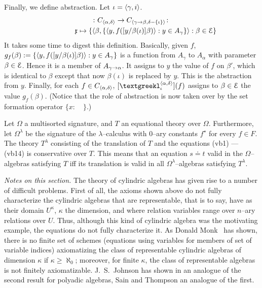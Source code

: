 Finally, we define abstraction. Let $\iota = \langle \gamma, i\rangle$.
\begin{multline}
[\tlambda^{\auf \alpha, \delta\zu}_{\iota}] \colon 
	C_{\auf \alpha, \delta\zu} \pf C_{\auf \gamma\pf\beta, 
	\delta - \{\iota\}\zu} \colon \\
\qquad\qquad 
\Gx \mapsto
    \{\auf \beta, \{\auf y, f([y/\beta(\iota)]\beta)\zu 
	: y \in A_{\gamma}\}\zu : \beta \in \CE\}
\end{multline}
It takes some time to digest this definition. Basically, given 
$f$, $g_{f}(\beta) := \{\auf y, f([y/\beta(\iota)]%
\beta)\zu : y \in A_{\gamma}\}$ is a function from $A_{\gamma}$ to 
$A_{\alpha}$ with parameter $\beta \in \mathcal{E}$. Hence it is a member of 
$A_{\gamma\rightarrow\alpha}$. It assigns to $y$ the value of $f$ on 
$\beta'$, which is identical to $\beta$ except that now 
$\beta(\iota)$ is replaced by $y$. This is the abstraction from $y$. 
Finally, for each $f \in C_{\langle \alpha, \delta\rangle}$, 
$[\tlambda^{\auf \alpha, \delta\zu}_{\iota}](f)$ assigns to 
$\beta \in \mathcal{E}$ the value $g_{f}(\beta)$. (Notice 
that the role of abstraction is now taken over by the set 
formation operator $\{x : \quad\}$.)
\begin{thm}
Let $\Omega$ a multisorted signature, and $T$ an equational theory over 
$\Omega$. Furthermore, let $\Omega^{\lambda}$ be the signature of 
the $\lambda$--calculus with 0--ary constants $f^{\star}$ for every 
$f \in F$. The theory $T^{\lambda}$ consisting of the translation of 
$T$ and the equations (vb1) --- (vb14) is conservative over $T$. This 
means that an equation $s \doteq t$ valid in the $\Omega$--algebras 
satisfying $T$ iff its translation is valid in all 
$\Omega^{\lambda}$--algebras satisfying $T^{\lambda}$. 
\end{thm}

{\it Notes on this section.} The theory of cylindric algebras has
given rise to a number of difficult problems. First of all, the
axioms shown above do not fully characterize the cylindric
algebras that are representable, that is to say, have as their
domain $U^{\kappa}$, $\kappa$ the dimension, and where relation
variables range over $n$--ary relations over $U$. Thus, although
this kind of cylindric algebra was the motivating example, the
equations do not fully characterize it. As Donald
Monk~ 
has shown, there is no finite set of
schemes (equations using variables for members of set of variable
indices) axiomatizing the class of representable cylindric
algebras of dimension $\kappa$ if $\kappa \geq \aleph_0$;
moreover, for finite $\kappa$, the class of representable algebras
is not finitely axiomatizable. J.~S.~Johnson has shown in
\cite{johnson:fpa} an analogue of the second result for polyadic
algebras, Sain and Thompson  
an analogue of the first.

